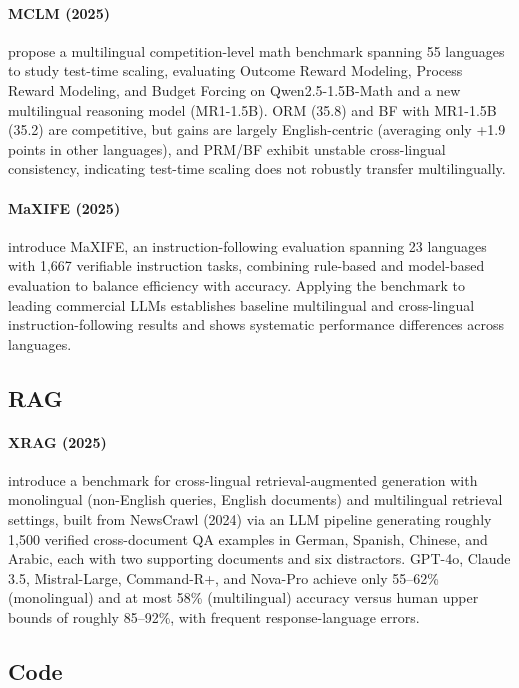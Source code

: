 \documentclass[letterpaper]{article}
\begin{document}
\paragraph{MCLM (2025)} \citet{son2025linguisticgeneralizabilitytesttimescaling} propose a multilingual competition-level math benchmark spanning 55 languages to study test-time scaling, evaluating Outcome Reward Modeling, Process Reward Modeling, and Budget Forcing on Qwen2.5-1.5B-Math and a new multilingual reasoning model (MR1-1.5B). ORM (35.8) and BF with MR1-1.5B (35.2) are competitive, but gains are largely English-centric (averaging only +1.9 points in other languages), and PRM/BF exhibit unstable cross-lingual consistency, indicating test-time scaling does not robustly transfer multilingually.

\paragraph{MaXIFE (2025)} \citet{liu2025maxifemultilingualcrosslingualinstruction} introduce MaXIFE, an instruction-following evaluation spanning 23 languages with 1{,}667 verifiable instruction tasks, combining rule-based and model-based evaluation to balance efficiency with accuracy. Applying the benchmark to leading commercial LLMs establishes baseline multilingual and cross-lingual instruction-following results and shows systematic performance differences across languages.

\subsection{RAG}

\paragraph{XRAG (2025)} \citet{liu2025xragcrosslingualretrievalaugmentedgeneration} introduce a benchmark for cross-lingual retrieval-augmented generation with monolingual (non-English queries, English documents) and multilingual retrieval settings, built from NewsCrawl (2024) via an LLM pipeline generating roughly 1,500 verified cross-document QA examples in German, Spanish, Chinese, and Arabic, each with two supporting documents and six distractors. GPT-4o, Claude 3.5, Mistral-Large, Command-R+, and Nova-Pro achieve only 55--62\% (monolingual) and at most 58\% (multilingual) accuracy versus human upper bounds of roughly 85--92\%, with frequent response-language errors.

\subsection{Code}
\end{document}
